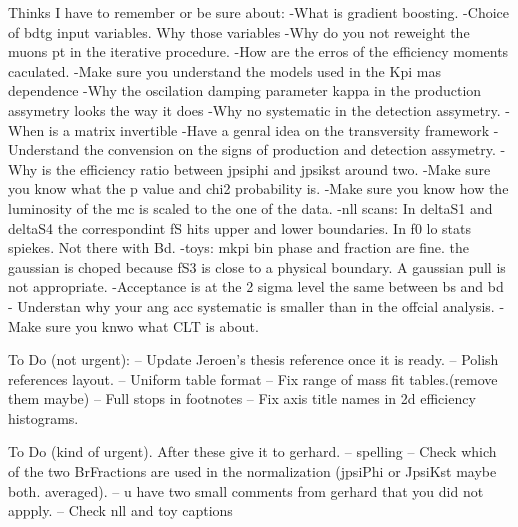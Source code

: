 
Thinks I have to remember or be sure about:
-What is gradient boosting.
-Choice of bdtg input variables. Why those variables
-Why do you not reweight the muons pt in the iterative procedure.
-How are the erros of the efficiency moments caculated.
-Make sure you understand the models used in the Kpi mas dependence
-Why the oscilation damping parameter kappa in the production assymetry looks the way it does 
-Why no systematic in the detection assymetry.
-When is a matrix invertible
-Have a genral idea on the transversity framework
-Understand the convension on the signs of production and detection assymetry.
-Why is the efficiency ratio between jpsiphi and jpsikst around two.
-Make sure you know what the p value and chi2 probability is.
-Make sure you know how the luminosity of the mc is scaled to the one of the data.
-nll scans: 
    In deltaS1 and deltaS4 the correspondint fS hits upper and lower boundaries.
    In f0 lo stats spiekes. Not there with Bd. 
-toys:
    mkpi bin phase and fraction are fine. the gaussian is choped because fS3 is close to a physical boundary. A gaussian pull is not appropriate.
-Acceptance is at the 2 sigma level the same between bs and bd
- Understan why your ang acc systematic is smaller than in the offcial analysis.
- Make sure you knwo what CLT is about.

To Do (not urgent):
-- Update Jeroen's thesis reference once it is ready.
-- Polish references layout.
-- Uniform table format
-- Fix range of mass fit tables.(remove them maybe)
-- Full stops in footnotes
-- Fix axis title names in 2d efficiency histograms.

To Do (kind of urgent). After these give it to gerhard.
-- spelling
-- Check which of the two BrFractions are used in the normalization (jpsiPhi or JpsiKst maybe both. averaged).
-- u have two small comments from gerhard that you did not appply.
-- Check nll and toy captions
